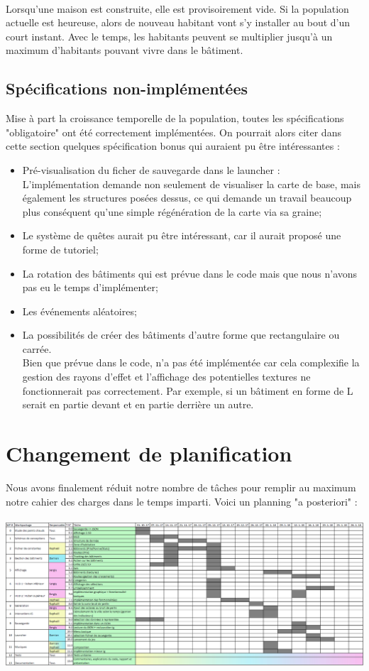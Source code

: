 \documentclass[a4paper,10pt,openany,oneside]{report}
\begin{document}
\paragraph{}
Lorsqu'une maison est construite, elle est provisoirement vide. Si la population actuelle est heureuse, alors de nouveau habitant vont s'y installer au bout d'un court instant. Avec le temps, les habitants peuvent se multiplier jusqu'à un maximum d'habitants pouvant vivre dans le bâtiment.
\subsection{Spécifications non-implémentées}
Mise à part la croissance temporelle de la population, toutes les spécifications "obligatoire" ont été correctement implémentées.
On pourrait alors citer dans cette section quelques spécification bonus qui auraient pu être intéressantes :
\begin{itemize}
\item Pré-visualisation du ficher de sauvegarde dans le launcher :\\
L'implémentation demande non seulement de visualiser la carte de base, mais également les structures posées dessus, ce qui demande un travail beaucoup plus conséquent qu'une simple régénération de la carte via sa graine;
\item Le système de quêtes aurait pu être intéressant, car il aurait proposé une forme de tutoriel;
\item La rotation des bâtiments qui est prévue dans le code mais que nous n'avons pas eu le temps d'implémenter;
\item Les événements aléatoires;
\item La possibilités de créer des bâtiments d'autre forme que rectangulaire ou carrée.\\
Bien que prévue dans le code, n'a pas été implémentée car cela complexifie la gestion des rayons d'effet et l'affichage des potentielles textures ne fonctionnerait pas correctement. Par exemple, si un bâtiment en forme de L serait en partie devant et en partie derrière un autre.
	
\end{itemize}

\section{Changement de planification}
Nous avons finalement réduit notre nombre de tâches pour remplir au maximum notre cahier des charges dans le temps imparti. Voici un planning "a posteriori" :\\\\
\includegraphics[width=1.1\textwidth]{img/planning_final.png}
\end{document}
